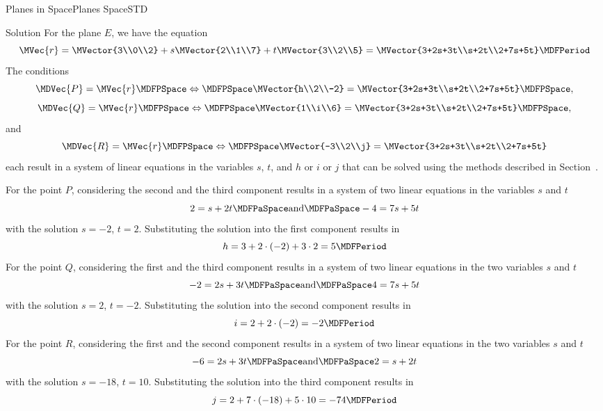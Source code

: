 \begin{MXContent}{Planes in Space}{Planes Space}{STD}
\begin{MExercise}
\begin{MHint}{Solution}
For the plane $E$, we have the equation
\[
 \MVec{r}=\MVector{3\\0\\2}+s\MVector{2\\1\\7}+t\MVector{3\\2\\5}=\MVector{3+2s+3t\\s+2t\\2+7s+5t} \MDFPeriod
\]
The conditions 
\[
 \MDVec{P}=\MVec{r}\MDFPSpace\Leftrightarrow\MDFPSpace\MVector{h\\2\\-2}=\MVector{3+2s+3t\\s+2t\\2+7s+5t} \MDFPSpace,
\]
\[
 \MDVec{Q}=\MVec{r}\MDFPSpace\Leftrightarrow\MDFPSpace\MVector{1\\i\\6}=\MVector{3+2s+3t\\s+2t\\2+7s+5t} \MDFPSpace,
\]
and
\[
 \MDVec{R}=\MVec{r}\MDFPSpace\Leftrightarrow\MDFPSpace\MVector{-3\\2\\j}=\MVector{3+2s+3t\\s+2t\\2+7s+5t}
\]
each result in a system of linear equations in the variables $s$, $t$, and $h$ or $i$ or $j$ 
that can be solved using the methods described in Section~.

For the point $P$, considering the second and the third component results in a system of two linear equations 
in the variables $s$ and $t$
\[
 2=s+2t\MDFPaSpace\textrm{and}\MDFPaSpace -4=7s+5t 
\]
with the solution $s=-2$, $t=2$. Substituting the solution into the first component results in
\[
 h=3+2\cdot(-2)+3\cdot 2=5 \MDFPeriod
\]
For the point $Q$, considering the first and the third component results in a system of two linear equations 
in the two variables $s$ and $t$
\[
 -2=2s+3t\MDFPaSpace\textrm{and}\MDFPaSpace 4=7s+5t
\]
with the solution $s=2$, $t=-2$. Substituting the solution into the second component results in
\[
 i=2+2\cdot(-2)=-2 \MDFPeriod
\]
For the point $R$, considering the first and the second component results in a system of two linear equations
in the two variables $s$ and $t$
\[
 -6=2s+3t\MDFPaSpace\textrm{and}\MDFPaSpace 2=s+2t
\]
with the solution $s=-18$, $t=10$. Substituting the solution into the third component results in
\[
 j=2+7\cdot(-18)+5\cdot10=-74 \MDFPeriod
\]
\end{MHint}

\end{MExercise}

\end{MXContent}


